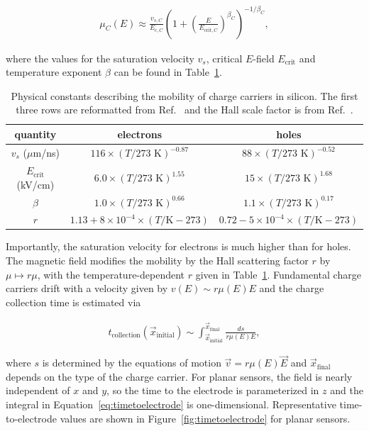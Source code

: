 \begin{align}
\label{eq:mobility}
\mu_{C}(E)\approx \frac{v_{s,C}}{E_{c,C}}\left(1+\left(\frac{E}{E_{\text{crit},C}}\right)^{\beta_C}\right)^{-1/{\beta_C}},
\end{align}

\noindent where the values for the saturation velocity $v_s$, critical $E$-field $E_\text{crit}$ and temperature exponent $\beta$ can be found in Table~\ref{eq:constants_rad}. 

\begin{table}[!htpb]
\centering
\begin{tabular}{ccc}
  \hline
   quantity & electrons & holes		\\
   \hline	
   \hline
  $v_s$ ($\mu$m/ns) & $116\times (T/273\text{ K})^{-0.87}$ & $88\times (T/273\text{ K})^{-0.52}$ \\
  $E_\text{crit}$ (kV/cm) & $6.0 \times (T/273\text{ K})^{1.55}$ & $15 \times  (T/273\text{ K})^{1.68}$ \\
  $\beta$ & $1.0 \times (T/273\text{ K})^{0.66} $& $1.1\times (T/273\text{ K})^{0.17} $\\
  $r$ &$1.13+8\times 10^{-4}\times (T/\text{K}-273)$ & $0.72-5\times 10^{-4}\times (T/\text{K}-273)$\\
  \hline  
\end{tabular}
\caption{Physical constants describing the mobility of charge carriers in silicon.  The first three rows are reformatted from Ref.~\cite{JACOBONI197777} and the Hall scale factor is from Ref.~\cite{hall1}.}
\label{eq:constants_rad}
\end{table}


 Importantly, the saturation velocity for electrons is much higher than for holes.  The magnetic field modifies the mobility by the Hall scattering factor $r$ by $\mu\mapsto r\mu$, with the temperature-dependent $r$ given in Table~\ref{eq:constants_rad}.  Fundamental charge carriers drift with a velocity given by $v(E)\sim r\mu(E)E$ and the charge collection time is estimated via

\begin{align}
\label{eq:timetoelectrode}
t_\text{collection}(\vec{x}_\text{initial})\sim\int_\text{$\vec{x}_\text{initial}$}^\text{$\vec{x}_\text{final}$}\frac{ds}{r\mu(E)E},
\end{align}

where $s$ is determined by the equations of motion $\vec{v}=r\mu(E)\vec{E}$ and $\vec{x}_\text{final}$ 
depends on the type of the charge carrier.  For planar sensors, the field is nearly independent of $x$ and 
$y$, so the time to the electrode is parameterized in $z$ and the integral in 
Equation~\ref{eq:timetoelectrode} is one-dimensional.    Representative time-to-electrode values are 
shown in Figure~\ref{fig:timetoelectrode} for planar  sensors.  


